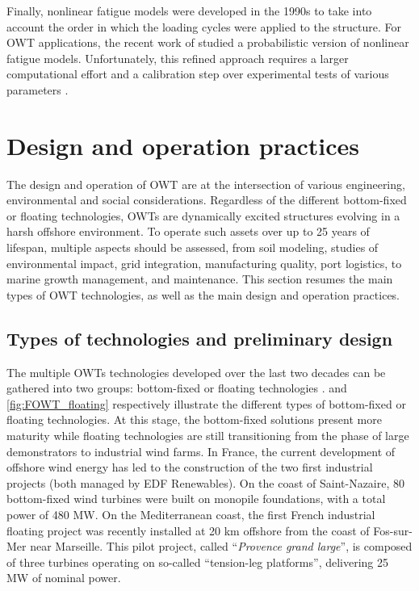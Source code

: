Finally, nonlinear fatigue models were developed in the 1990s \citep{fatemi_1998} to take into account the order in which the loading cycles were applied to the structure. 
For OWT applications, the recent work of \citet{rocher_2020_nonlinear_fatigue} studied a probabilistic version of nonlinear fatigue models. 
Unfortunately, this refined approach requires a larger computational effort and a calibration step over experimental tests of various parameters \citep{freyssinet_2023_nonlinear_fatigue}.  


\section{Design and operation practices} \label{sec:owt_design}

The design and operation of OWT are at the intersection of various engineering, environmental and social considerations. 
Regardless of the different bottom-fixed or floating technologies, OWTs are dynamically excited structures evolving in a harsh offshore environment.   
To operate such assets over up to 25 years of lifespan, multiple aspects should be assessed, from soil modeling, studies of environmental impact, grid integration, manufacturing quality, port logistics, to marine growth management, and maintenance. 
This section resumes the main types of OWT technologies, as well as the main design and operation practices.   

\subsection{Types of technologies and preliminary design}
The multiple OWTs technologies developed over the last two decades can be gathered into two groups: bottom-fixed or floating technologies \citep{eolien_en_mer_2022}. 
 and \ref{fig:FOWT_floating} respectively illustrate the different types of bottom-fixed or floating technologies. 
At this stage, the bottom-fixed solutions present more maturity while floating technologies are still transitioning from the phase of large demonstrators to industrial wind farms. 
In France, the current development of offshore wind energy has led to the construction of the two first industrial projects (both managed by EDF Renewables). 
On the coast of Saint-Nazaire, 80 bottom-fixed wind turbines were built on monopile foundations, with a total power of 480 MW. 
On the Mediterranean coast, the first French industrial floating project was recently installed at 20 km offshore from the coast of Fos-sur-Mer near Marseille. 
This pilot project, called ``\textit{Provence grand large}'', is composed of three turbines operating on so-called ``tension-leg platforms'', delivering 25 MW of nominal power.     

